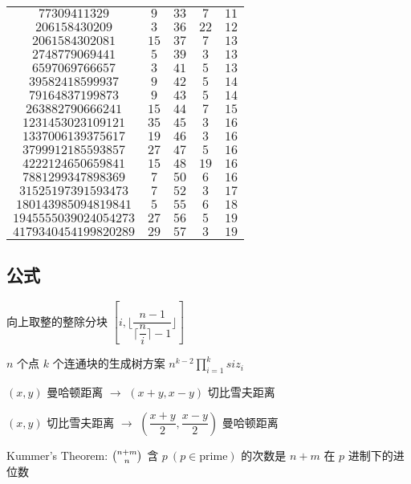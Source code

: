 \documentclass[12pt]{ctexart}
\begin{document}
\begin{table}[H]
\begin{tabular}{|c|c|c|c|c|}
		$77309411329$         & $9$   & $33$ & $7$       & $11$ \\
		$206158430209$        & $3$   & $36$ & $22$      & $12$ \\
		$2061584302081$       & $15$  & $37$ & $7$       & $13$ \\
		$2748779069441$       & $5$   & $39$ & $3$       & $13$ \\
		$6597069766657$       & $3$   & $41$ & $5$       & $13$ \\
		$39582418599937$      & $9$   & $42$ & $5$       & $14$ \\
		$79164837199873$      & $9$   & $43$ & $5$       & $14$ \\
		$263882790666241$     & $15$  & $44$ & $7$       & $15$ \\
		$1231453023109121$    & $35$  & $45$ & $3$       & $16$ \\
		$1337006139375617$    & $19$  & $46$ & $3$       & $16$ \\
		$3799912185593857$    & $27$  & $47$ & $5$       & $16$ \\
		$4222124650659841$    & $15$  & $48$ & $19$      & $16$ \\
		$7881299347898369$    & $7$   & $50$ & $6$       & $16$ \\
		$31525197391593473$   & $7$   & $52$ & $3$       & $17$ \\
		$180143985094819841$  & $5$   & $55$ & $6$       & $18$ \\
		$1945555039024054273$ & $27$  & $56$ & $5$       & $19$ \\
		$4179340454199820289$ & $29$  & $57$ & $3$       & $19$ \\
		\bottomrule
	\end{tabular}

\end{table}
\subsection{公式}

向上取整的整除分块 $[i,\lfloor\dfrac{n-1}{\lceil\dfrac ni \rceil-1}\rfloor]$

$n$ 个点 $k$ 个连通块的生成树方案 $n^{k-2}\prod\limits_{i=1}^k siz_i$

$(x,y)$ 曼哈顿距离 $\to$ $(x+y,x-y)$ 切比雪夫距离

$(x,y)$ 切比雪夫距离 $\to$ $(\dfrac{x+y}{2},\dfrac{x-y}{2})$ 曼哈顿距离

Kummer's Theorem: $\tbinom{n+m}{n}$ 含 $p~(p\in \text {prime})$ 的次数是 $n+m$ 在 $p$ 进制下的进位数
\end{document}
